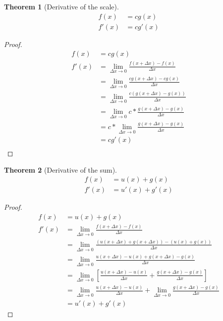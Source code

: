\documentclass{article}
\newtheorem{theorem}{Theorem}[section]
\theoremstyle{definition}
\begin{document}
\begin{theorem}[Derivative of the scale]\label{theorems:calculus:derivatives:scale}
	\begin{align*}
	f(x) &= cg(x)\\
	f'(x) &= cg'(x)
	\end{align*}
\end{theorem}
\begin{proof}
	\begin{align*}
		f(x) &= cg(x) \\
		f'(x) &= \lim_{\Delta x \to 0} {\frac {f(x+\Delta x) - f(x)} {\Delta x}} \\
		&= \lim_{\Delta x \to 0} {\frac {cg(x+\Delta x) - cg(x)} {\Delta x}} \\
		&= \lim_{\Delta x \to 0} {\frac {c(g(x+\Delta x) - g(x))} {\Delta x}} \\
		&= \lim_{\Delta x \to 0} {c * \frac {g(x+\Delta x) - g(x)} {\Delta x}} \\
		&= c*\lim_{\Delta x \to 0} {\frac {g(x+\Delta x) - g(x)} {\Delta x}} \\
		&= cg'(x) \\
	\end{align*}
\end{proof}

\begin{theorem}[Derivative of the sum]\label{theorems:calulus:derivatives:sum}
	\begin{align*}
	f(x) &= u(x)+g(x)\\
	f'(x) &= u'(x)+g'(x)
	\end{align*}
\end{theorem}
\begin{proof}
	\begin{align*}
	f(x) &= u(x)+g(x) \\
	f'(x) &= \lim_{\Delta x \to 0} {\frac {f(x+\Delta x) - f(x)} {\Delta x}} \\
	&= \lim_{\Delta x \to 0} {\frac {(u(x+\Delta x)+g(x + \Delta x)) - (u(x)+g(x))} {\Delta x}} \\
	&= \lim_{\Delta x \to 0} {\frac {u(x+\Delta x) - u(x) +g(x + \Delta x) - g(x)} {\Delta x}} \\
	&= \lim_{\Delta x \to 0} {\left[\frac {u(x+\Delta x) - u(x)} {\Delta x} + \frac {g(x + \Delta x) - g(x)} {\Delta x} \right]} \\
	&= \lim_{\Delta x \to 0} {\frac {u(x+\Delta x) - u(x)} {\Delta x}} + \lim_{\Delta x \to 0} {\frac {g(x + \Delta x) - g(x)} {\Delta x}} \\
	&= u'(x) + g'(x)
	\end{align*}
\end{proof}
\end{document}
